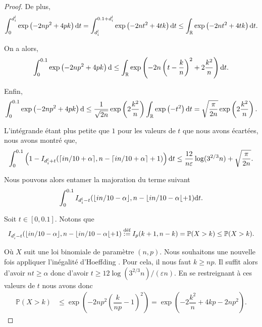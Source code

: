 \begin{proof}
    De plus,
    \begin{align*}
        \int_0^{d_i^l}\exp\left( -2np^2 + 4p{k} \right)\mathrm{d} t = \int_{d_i^l}^{{0.1 + d_i^l}}\exp\left( -2nt^2 + 4t{k} \right)\mathrm{d} t \leq \int_{\mathbb{R}}\exp\left( -2nt^2 + 4t{k} \right)\mathrm{d} t.
    \end{align*}

    On a alors,
    \[
        \int_0^{0.1}\exp\left( -2np^2 + 4p{k} \right)\mathrm{d} \leq  \int_{\mathbb{R}}\exp\left( -2n\left(t - \dfrac{{k}}{n}\right)^2 + 2 \dfrac{{k}^2}{n} \right)\mathrm{d} t.
    \]

    Enfin,
    \[
        \int_0^{0.1}\exp\left( -2np^2 + 4p{k} \right)\mathrm{d} \leq \dfrac{1}{\sqrt{2n}}\exp\left( 2 \dfrac{{k}^2}{n} \right) \int_{\mathbb{R}}\exp\left( -t^2 \right)\mathrm{d} t = \sqrt{\dfrac{\pi}{2n}}\exp\left( 2 \dfrac{{k}^2}{n} \right).
    \]

    L'intégrande étant plus petite que \(1\) pour les valeurs de \(t\) que nous avons écartées, nous avons montré que,
    \begin{align}
        \int_{0}^{0.1}\left( 1 - I_{d_i^l + t}(\lceil in/10 + \alpha \rceil , n - \lceil in/10 + \alpha\rceil + 1) \right) \mathrm{d} t \leq \dfrac{12}{n\varepsilon}\log(3^{2/3}n) + \sqrt{\dfrac{\pi}{2n}}.
    \end{align}

    Nous pouvons alors entamer la majoration du terme suivant 
    \[
        \int_{0}^{0.1}I_{d_i^l - t}(\lfloor in/10 - \alpha \rfloor, n - \lfloor in/10 -  \alpha\lfloor + 1) \mathrm{d} t.    
    \]

    \newcommand{\kfloor}{{k}}
    Soit \(t \in [0, 0.1]\). Notons que 
    \[
        \begin{array}[]{rcl}
            I_{d_i^l - t}(\lfloor in/10 - \alpha \rfloor, n - \lfloor in/10 -  \alpha\lfloor + 1) \overset{\text{déf}}{:=} I_{p}(k+1, n - k) = \mathbb P(X > k) \leq \mathbb P(X > \kfloor).
        \end{array}    
    \]

    Où \(X\) suit une loi binomiale de paramètre \((n,p)\). Nous souhaitons une nouvelle fois appliquer l'inégalité d'{\sc Hoeffding} \cite{10.5555/3134214}. Pour cela, il nous faut \(\kfloor \geq np\). Il suffit alors d'avoir \(nt \geq \alpha\) donc d'avoir \(t \geq 12\log(3^{2/3}n)/(\varepsilon n)\). En se restreignant à ces valeurs de \(t\) nous avons donc 
    \begin{align*}
        \mathbb P(X > \kfloor) & \leq \exp\left( -2np^2\left( \dfrac{\kfloor}{np} - 1 \right)^2 \right) = \exp\left(  -2\dfrac{\kfloor^2}{n} +4\kfloor p  - 2np^2  \right).
    \end{align*}


\end{proof}
